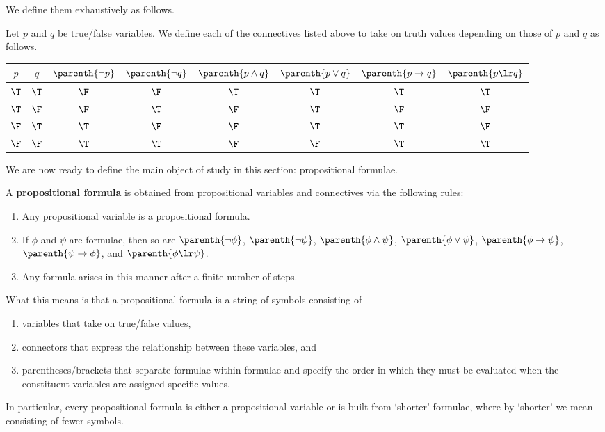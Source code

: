 We define them exhaustively as follows.
\begin{boxdefinition}[Connectives]\label{Ch1:Def:Connective}
    Let $p$ and $q$ be true/false variables. We define each of the connectives listed above to take on truth values depending on those of $p$ and $q$ as follows.
    \begin{table}[H]
        \centering
        \begin{tabular}{cc|cccccc}
             $p$ & $q$ & $\parenth{\neg p}$ & $\parenth{\neg q}$ & $\parenth{p \land q}$ & $\parenth{p \lor q}$ & $\parenth{p \to q}$ & $\parenth{p \lr q}$ \\
             \hline
             $\T$ & $\T$ & $\F$ & $\F$ & $\T$ & $\T$ & $\T$ & $\T$ \\
             $\T$ & $\F$ & $\F$ & $\T$ & $\F$ & $\T$ & $\F$ & $\F$ \\
             $\F$ & $\T$ & $\T$ & $\F$ & $\F$ & $\T$ & $\T$ & $\F$ \\
             $\F$ & $\F$ & $\T$ & $\T$ & $\F$ & $\F$ & $\T$ & $\T$
        \end{tabular}
        \label{tab:my_label}
    \end{table}
\end{boxdefinition}

We are now ready to define the main object of study in this section: propositional formulae.

\begin{boxdefinition}\label{Ch1:Def:PropFormula}
    A \textbf{propositional formula} is obtained from propositional variables and connectives via the following rules:
    \begin{enumerate}[label=\normalfont (\roman*), noitemsep]
        \item Any propositional variable is a propositional formula.
        \item If $\phi$ and $\psi$ are formulae, then so are $\parenth{\neg \phi}$, $\parenth{\neg \psi}$, $\parenth{\phi \land \psi}$, $\parenth{\phi \lor \psi}$, $\parenth{\phi \to \psi}$, $\parenth{\psi \to \phi}$, and $\parenth{\phi \lr \psi}$.
        \item Any formula arises in this manner after a finite number of steps.
    \end{enumerate}
\end{boxdefinition}

What this means is that a propositional formula is a string of symbols consisting of
\begin{enumerate}[noitemsep]
    \item variables that take on true/false values,
    \item connectors that express the relationship between these variables, and
    \item parentheses/brackets that separate formulae within formulae and specify the order in which they must be evaluated when the constituent variables are assigned specific values.
\end{enumerate}
In particular, every propositional formula is either a propositional variable or is built from `shorter' formulae, where by `shorter' we mean consisting of fewer symbols.

